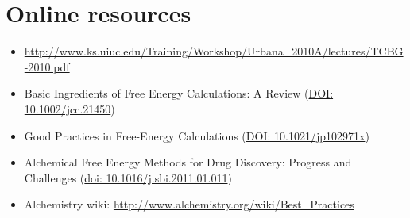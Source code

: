 \documentclass[9pt,bestpractices]{livecoms}
\begin{document}
\section{Online resources}
\begin{itemize}
\item \url{http://www.ks.uiuc.edu/Training/Workshop/Urbana_2010A/lectures/TCBG-2010.pdf}
\item Basic Ingredients of Free Energy Calculations: A Review (\url{DOI: 10.1002/jcc.21450})
\item Good Practices in Free-Energy Calculations (\url{DOI: 10.1021/jp102971x})
\item Alchemical Free Energy Methods for Drug Discovery: Progress and Challenges (\url{doi: 10.1016/j.sbi.2011.01.011})
\item Alchemistry wiki: \url{http://www.alchemistry.org/wiki/Best_Practices}
\end{itemize}

\clearpage
\end{document}
